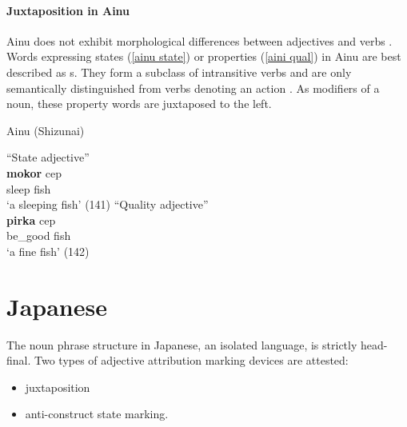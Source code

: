 \paragraph*{Juxtaposition in Ainu}
\label{ainu synchr}
Ainu does not exhibit morphological differences between adjectives and verbs \citep[27]{refsing1986}. Words expressing states (\ref{ainu state}) or properties (\ref{aini qual}) in Ainu are best described as s. They form a subclass of intransitive verbs and are only semantically distinguished from verbs denoting an action \citep[141–142]{refsing1986}. As modifiers of a noun, these property words are juxtaposed to the left.
\begin{exe}
\ex \rm{Ainu (Shizunai) \citep{refsing1986}}
\begin{xlist}
\ex \rm{“State adjective”}\\
\label{ainu state}
\gll	\textbf{mokor} cep\\
	sleep fish\\
\glt	‘a sleeping fish’ (141)
\ex \rm{“Quality adjective”}\\
\label{aini qual}
\gll	\textbf{pirka} cep\\
	be\_good fish\\
\glt	‘a fine fish’ (142)
\end{xlist}
\end{exe}

\section{Japanese}
The noun phrase structure in Japanese, an isolated language, is strictly head-final. Two types of adjective attribution marking devices are attested:
\begin{itemize}
\item juxtaposition
\item anti\hyp{}construct state marking.
\end{itemize}
